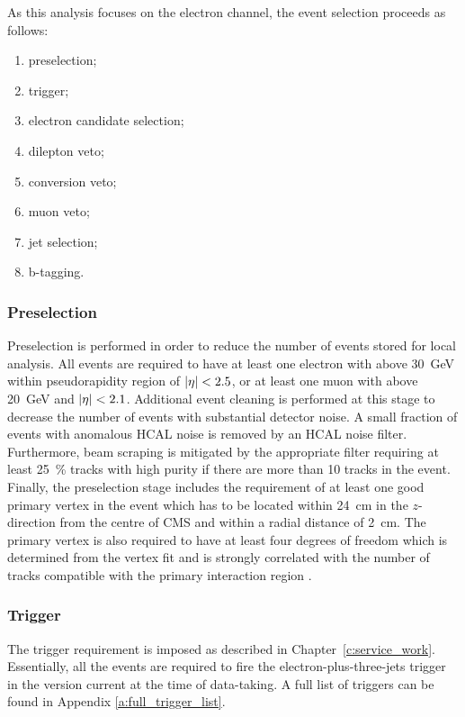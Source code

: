 As this analysis focuses on the electron channel, the event selection proceeds as follows:

\begin{enumerate}[topsep=\parskip, parsep=\parskip, itemsep=\parskip, leftmargin=\leftmargin]
	\item preselection;
	\item trigger;
	\item electron candidate selection;
	\item dilepton veto;
	\item conversion veto;
	\item muon veto;
	\item jet selection;
	\item b-tagging.
\end{enumerate}

\subsubsection*{Preselection}
Preselection is performed in order to reduce the number of events stored for local analysis. All events are required to
have at least one electron with \ET above \SI{30}{\GeV} within pseudorapidity region of $\lvert \eta \rvert < 2.5$, or at least
one muon with \pt above \SI{20}{\GeV} and $\lvert \eta \rvert < 2.1$. Additional event cleaning is performed at this stage to
decrease the number of events with substantial detector noise. A small fraction of events with anomalous HCAL noise is
removed by an HCAL noise filter. Furthermore, beam scraping is mitigated by the appropriate filter requiring at least
\SI{25}{\percent} tracks with high purity if there are more than \num{10} tracks in the event. Finally, the preselection
stage includes the requirement of at least one good primary vertex in the event which has to be located within
\SI{24}{\cm} in the $z$-direction from the centre of CMS and within a radial distance of \SI{2}{\cm}. The primary vertex
is also required to have at least four degrees of freedom which is determined from the vertex fit and is strongly
correlated with the number of tracks compatible with the primary interaction region \autocite{Tacking_PV_results_7TeV}.


\subsubsection*{Trigger}
The trigger requirement is imposed as described in Chapter~\ref{c:service_work}. Essentially, all the events are
required to fire the electron-plus-three-jets trigger in the version current at the time of data-taking. A full list of
triggers can be found in Appendix \ref{a:full_trigger_list}.

